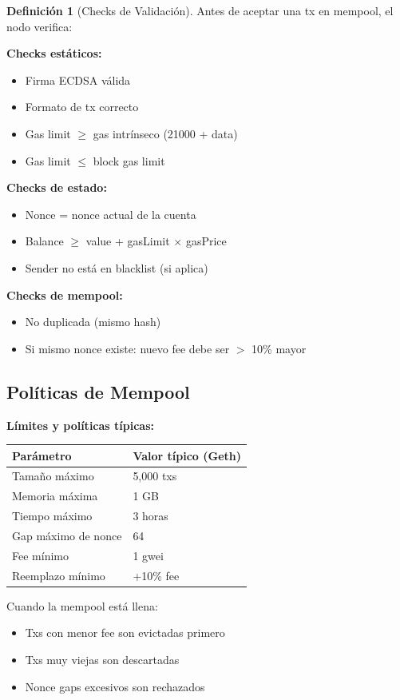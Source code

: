 \documentclass[11pt,a4paper,twoside,openright]{book}
\theoremstyle{definition}
\newtheorem{definition}{Definición}[chapter]
\theoremstyle{plain}
\theoremstyle{remark}
\begin{document}
\begin{definition}[Checks de Validación]
Antes de aceptar una tx en mempool, el nodo verifica:

\textbf{Checks estáticos:}
\begin{itemize}
    \item Firma ECDSA válida
    \item Formato de tx correcto
    \item Gas limit $\geq$ gas intrínseco (21000 + data)
    \item Gas limit $\leq$ block gas limit
\end{itemize}

\textbf{Checks de estado:}
\begin{itemize}
    \item Nonce = nonce actual de la cuenta
    \item Balance $\geq$ value + gasLimit $\times$ gasPrice
    \item Sender no está en blacklist (si aplica)
\end{itemize}

\textbf{Checks de mempool:}
\begin{itemize}
    \item No duplicada (mismo hash)
    \item Si mismo nonce existe: nuevo fee debe ser $>$ 10\% mayor
\end{itemize}
\end{definition}

\subsection{Políticas de Mempool}

\begin{mathnote}
\textbf{Límites y políticas típicas:}

\begin{center}
\begin{tabular}{ll}
\toprule
\textbf{Parámetro} & \textbf{Valor típico (Geth)} \\
\midrule
Tamaño máximo & 5,000 txs \\
Memoria máxima & 1 GB \\
Tiempo máximo & 3 horas \\
Gap máximo de nonce & 64 \\
Fee mínimo & 1 gwei \\
Reemplazo mínimo & +10\% fee \\
\bottomrule
\end{tabular}
\end{center}

Cuando la mempool está llena:
\begin{itemize}
    \item Txs con menor fee son evictadas primero
    \item Txs muy viejas son descartadas
    \item Nonce gaps excesivos son rechazados
\end{itemize}
\end{mathnote}
\end{document}
